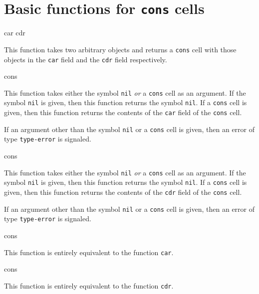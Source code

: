 \chapter{Basic functions for \texttt{cons} cells}
\label{chap-basic-cons-functions}

 {car cdr}

This function takes two arbitrary \lisp{} objects and returns a
\texttt{cons} cell with those objects in the \texttt{car} field and
the \texttt{cdr} field respectively.

 {cons}

This function takes either the symbol \texttt{nil} \emph{or} a
\texttt{cons} cell as an argument.  If the symbol \texttt{nil} is
given, then this function returns the symbol \texttt{nil}.  If a
\texttt{cons} cell is given, then this function returns the contents
of the \texttt{car} field of the \texttt{cons} cell.

If an argument other than the symbol \texttt{nil} or a \texttt{cons}
cell is given, then an error of type \texttt{type-error} is signaled. 

 {cons}

This function takes either the symbol \texttt{nil} \emph{or} a
\texttt{cons} cell as an argument.  If the symbol \texttt{nil} is
given, then this function returns the symbol \texttt{nil}.  If a
\texttt{cons} cell is given, then this function returns the contents
of the \texttt{cdr} field of the \texttt{cons} cell.

If an argument other than the symbol \texttt{nil} or a \texttt{cons}
cell is given, then an error of type \texttt{type-error} is signaled. 

 {cons}

This function is entirely equivalent to the function \texttt{car}.

 {cons}

This function is entirely equivalent to the function \texttt{cdr}.

